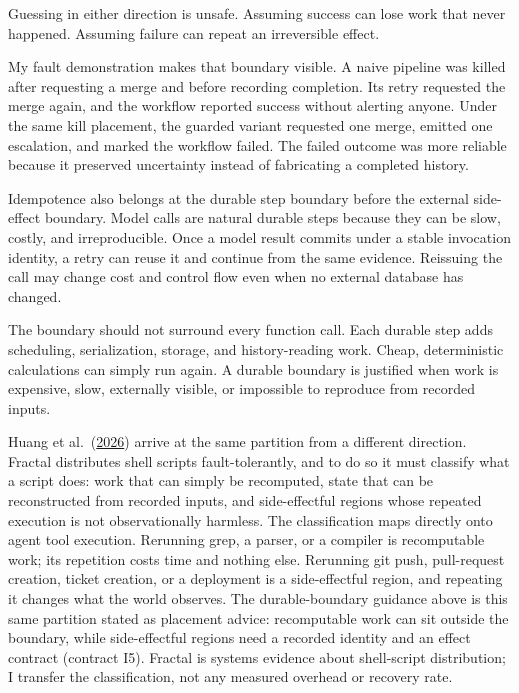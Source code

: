 Guessing in either direction is unsafe. Assuming success can lose work that never happened. Assuming failure can repeat an irreversible effect.

My fault demonstration makes that boundary visible. A naive pipeline was killed after requesting a merge and before recording completion. Its retry requested the merge again, and the workflow reported success without alerting anyone. Under the same kill placement, the guarded variant requested one merge, emitted one escalation, and marked the workflow failed. The failed outcome was more reliable because it preserved uncertainty instead of fabricating a completed history.

Idempotence also belongs at the durable step boundary before the external side-effect boundary. Model calls are natural durable steps because they can be slow, costly, and irreproducible. Once a model result commits under a stable invocation identity, a retry can reuse it and continue from the same evidence. Reissuing the call may change cost and control flow even when no external database has changed.

The boundary should not surround every function call. Each durable step adds scheduling, serialization, storage, and history-reading work. Cheap, deterministic calculations can simply run again. A durable boundary is justified when work is expensive, slow, externally visible, or impossible to reproduce from recorded inputs.

Huang et al.~(\href{https://www.usenix.org/conference/nsdi26/presentation/huang}{2026}) arrive at the same partition from a different direction. Fractal distributes shell scripts fault-tolerantly, and to do so it must classify what a script does: work that can simply be recomputed, state that can be reconstructed from recorded inputs, and side-effectful regions whose repeated execution is not observationally harmless. The classification maps directly onto agent tool execution. Rerunning grep, a parser, or a compiler is recomputable work; its repetition costs time and nothing else. Rerunning git push, pull-request creation, ticket creation, or a deployment is a side-effectful region, and repeating it changes what the world observes. The durable-boundary guidance above is this same partition stated as placement advice: recomputable work can sit outside the boundary, while side-effectful regions need a recorded identity and an effect contract (contract I5). Fractal is systems evidence about shell-script distribution; I transfer the classification, not any measured overhead or recovery rate.

